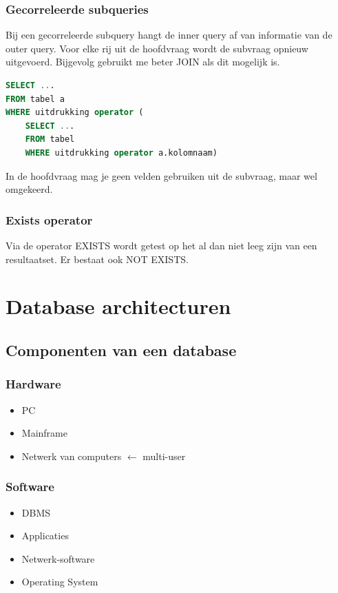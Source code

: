 \documentclass[a4paper,12pt]{article}
\begin{document}
\subsubsection{Gecorreleerde subqueries}
Bij een gecorreleerde subquery hangt de inner query af van informatie van de outer query. Voor elke rij uit de hoofdvraag wordt de subvraag opnieuw uitgevoerd. Bijgevolg gebruikt me beter JOIN als dit mogelijk is.

\begin{lstlisting}[language=sql]
SELECT ...
FROM tabel a
WHERE uitdrukking operator (
	SELECT ...
	FROM tabel
	WHERE uitdrukking operator a.kolomnaam)
\end{lstlisting}
In de hoofdvraag mag je geen velden gebruiken uit de subvraag, maar wel omgekeerd.

\subsubsection{Exists operator}
Via de operator EXISTS wordt getest op het al dan niet leeg zijn van een resultaatset. Er bestaat ook NOT EXISTS.

\section{Database architecturen}
\subsection{Componenten van een database}
\subsubsection{Hardware}
\begin{itemize}
\item PC
\item Mainframe
\item Netwerk van computers $\leftarrow$ multi-user
\end{itemize}

\subsubsection{Software}
\begin{itemize}
\item DBMS
\item Applicaties
\item Netwerk-software
\item Operating System
\end{itemize}
\end{document}
